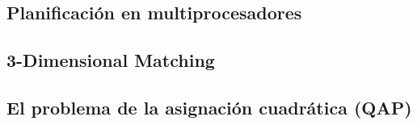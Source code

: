 \documentclass[a4paper, 11pt]{article} %
\begin{document}
  \subsection{Planificación en multiprocesadores}
        \small
  	\texttt{}
        \normalsize
  \subsection{3-Dimensional Matching}
        \small
  	\texttt{}
        \normalsize
  \subsection{El problema de la asignación cuadrática (QAP)}
        \small
        \normalsize

    
\end{document}
